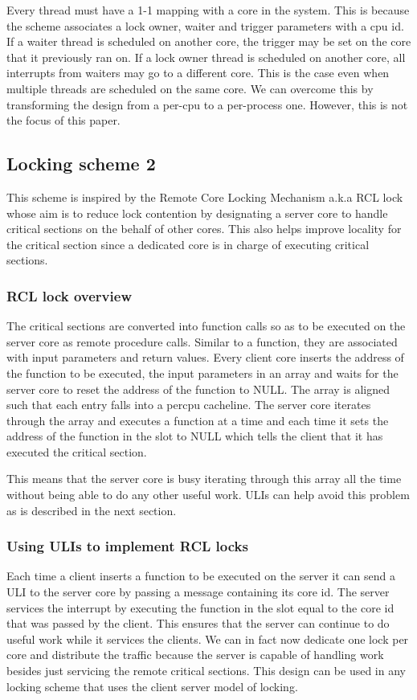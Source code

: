 Every thread must have a 1-1 mapping with a core in the system. This is because
the scheme associates a lock owner, waiter and trigger parameters with a cpu id.
If a waiter thread is scheduled on another core, the trigger may be set on the
core that it previously ran on. If a lock owner thread is scheduled on another
core, all interrupts from waiters may go to a different core. This is the case
even when multiple threads are scheduled on the same core. We can overcome this
by transforming the design from a per-cpu to a per-process one. However, this is
not the focus of this paper.

\subsection{Locking scheme 2}

This scheme is inspired by the Remote Core Locking Mechanism a.k.a RCL lock
whose aim is to reduce lock contention by designating a server core to handle
critical sections on the behalf of other cores. This also helps improve locality
for the critical section since a dedicated core is in charge of executing
critical sections. 

\subsubsection{RCL lock overview}

The critical sections are converted into function calls so as to be executed on
the server core as remote procedure calls. Similar to a function, they are
associated with input parameters and return values. Every client core inserts
the address of the function to be executed, the input parameters in an array and
waits for the server core to reset the address of the function to NULL. The
array is aligned such that each entry falls into a percpu cacheline. The server
core iterates through the array and executes a function at a time and each time
it sets the address of the function in the slot to NULL which tells the client
that it has executed the critical section.

This means that the server core is busy iterating through this array all the
time without being able to do any other useful work. ULIs can help avoid this
problem as is described in the next section.

\subsubsection{Using ULIs to implement RCL locks}

Each time a client inserts a function to be executed on the server it can send a
ULI to the server core by passing a message containing its core id. The server
services the interrupt by executing the function in the slot equal to the core
id that was passed by the client. This ensures that the server can continue to
do useful work while it services the clients. We can in fact now dedicate one
lock per core and distribute the traffic because the server is capable of
handling work besides just servicing the remote critical sections. This design
can be used in any locking scheme that uses the client server model of locking.
